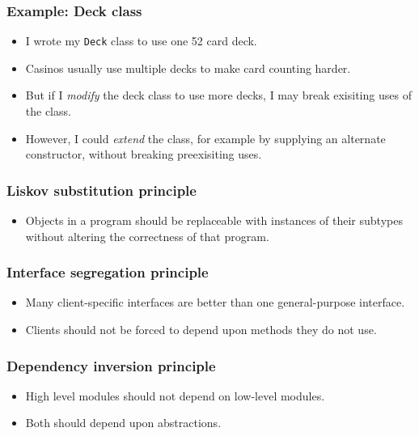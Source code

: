 \documentclass[10pt]{beamer}
\begin{document}
\begin{frame}
	\frametitle{Example: Deck class}
	\begin{itemize}
		\item I wrote my \texttt{Deck} class to use one 52 card deck.
		\item Casinos usually use multiple decks to make card counting harder.
		\item But if I \emph{modify} the deck class to use more decks,
			I may break exisiting uses of the class.
		\item However, I could \emph{extend} the class, for example by 
			supplying an alternate constructor, without breaking 
			preexisiting uses.
	\end{itemize}
\end{frame}
\begin{frame}
	\frametitle{Liskov substitution principle}
	\begin{itemize}
            \item Objects in a program should be replaceable with instances of their subtypes without altering the correctness of that program.
	\end{itemize}
\end{frame}
\begin{frame}
	\frametitle{Interface segregation principle}
	\begin{itemize}
            \item Many client-specific interfaces are better than one general-purpose interface.
	    \item Clients should not be forced to depend upon methods they do not use.
	\end{itemize}
\end{frame}
\begin{frame}
	\frametitle{Dependency inversion principle}
	\begin{itemize}
            \item High level modules should not depend on low-level modules.
	    \item Both should depend upon abstractions.
	\end{itemize}
\end{frame}
\end{document}
